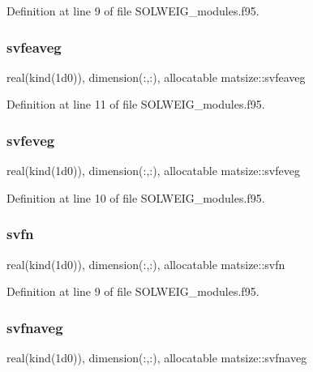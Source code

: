 Definition at line 9 of file S\+O\+L\+W\+E\+I\+G\+\_\+modules.\+f95.

\mbox{\label{namespacematsize_abd5b108fa6d58f69e170177ddc18ee1e}} 
\subsubsection{\texorpdfstring{svfeaveg}{svfeaveg}}
{\footnotesize\ttfamily real(kind(1d0)), dimension(\+:,\+:), allocatable matsize\+::svfeaveg}



Definition at line 11 of file S\+O\+L\+W\+E\+I\+G\+\_\+modules.\+f95.

\mbox{\label{namespacematsize_a0f7143b0902f59ee105a54c791da8bae}} 
\subsubsection{\texorpdfstring{svfeveg}{svfeveg}}
{\footnotesize\ttfamily real(kind(1d0)), dimension(\+:,\+:), allocatable matsize\+::svfeveg}



Definition at line 10 of file S\+O\+L\+W\+E\+I\+G\+\_\+modules.\+f95.

\mbox{\label{namespacematsize_a9be189162686f197e78ed45b00840619}} 
\subsubsection{\texorpdfstring{svfn}{svfn}}
{\footnotesize\ttfamily real(kind(1d0)), dimension(\+:,\+:), allocatable matsize\+::svfn}



Definition at line 9 of file S\+O\+L\+W\+E\+I\+G\+\_\+modules.\+f95.

\mbox{\label{namespacematsize_a258fb6132f8bd0d53c601353e796c424}} 
\subsubsection{\texorpdfstring{svfnaveg}{svfnaveg}}
{\footnotesize\ttfamily real(kind(1d0)), dimension(\+:,\+:), allocatable matsize\+::svfnaveg}



